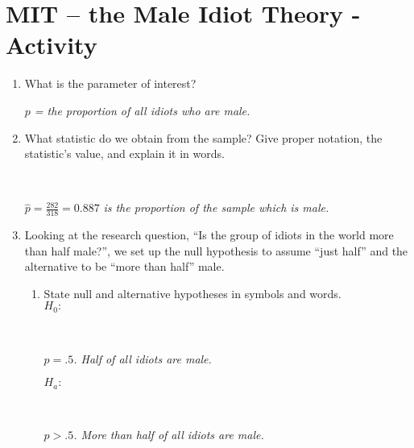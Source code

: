 \def\theTopic{Inference on Proportions }
\def\dayNum{8}


\section{ MIT -- the Male Idiot Theory - Activity}

\begin{enumerate}
   \item  What is the parameter of interest?
\begin{students}
    \vspace{1cm}    
\end{students}
\begin{key} 
  {\it $p$ = the proportion of all idiots who are male.}
\end{key}
  \item \label{MIT.phat} What statistic do we obtain from the sample?
    Give proper notation, the statistic's value, and explain it in words.
\begin{students}
    \vspace*{2cm}    \\
\end{students}
\begin{key} 
   { $\widehat{p} = \frac{282}{318} = 0.887$ \it is the
    proportion of the sample which is male.}
\end{key}
\item Looking at the research question, ``Is the group of idiots in the world
  more than half male?'',   we set
  up the null hypothesis to assume ``just half'' and the alternative to be
  ``more than half'' male.
    \begin{enumerate}
    \item State null and alternative hypotheses in symbols and
      words.\\
      $H_0:$ 
\begin{students}
    \vspace{1.5cm}    \\
\end{students}
\begin{key} 
{\it $p = .5$.  Half of all idiots are male.}
\end{key}
$H_a:$
\begin{students}
    \vspace{1cm}    \\
\end{students}
\begin{key} 
{\it $p > .5$.  More than half of all idiots are male.}

\end{key}
\end{enumerate}
\end{enumerate}

